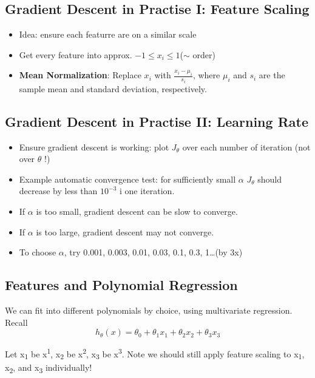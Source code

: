     \subsection{Gradient Descent in Practise I: Feature Scaling} 
    
        \begin{itemize}
            \item Idea: ensure each featurre are on a similar scale
            \item Get every feature into approx. $-1\leq x_i \leq1 $($\sim$ order)
            \item \textbf{Mean Normalization}: Replace $x_i$ with $\frac{x_i - \mu_i}{s_i}$, where $\mu_i$ and $s_i$ are the sample mean and standard deviation, respectively.

        \end{itemize}

    \subsection{Gradient Descent in Practise II: Learning Rate}
        
        \begin{itemize}
            \item Ensure gradient descent is working: plot $J_\theta$ over each number of iteration (not over $\theta$ !)
            \item Example automatic convergence test: for sufficiently small $\alpha$ $J_\theta$ should decrease by less than $10^{-3}$ i one iteration.
            \item If $\alpha$ is too small, gradient descent can be slow to converge.
            \item If $\alpha$ is too large, gradient descent may not converge.
            \item To choose $\alpha$, try 0.001, 0.003, 0.01, 0.03, 0.1, 0.3, 1\ldots (by 3x)
        \end{itemize}


    \subsection{Features and Polynomial Regression}
        We can fit into different polynomials by choice, using multivariate regression. Recall
        \[
            h_\theta (x) = \theta_0 + \theta_1x_1 + \theta_2x_2 +\theta_3x_3 
        \]  

        Let x\textsubscript{1} be x\textsuperscript{1}, x\textsubscript{2} be x\textsuperscript{2}, x\textsubscript{3} be x\textsuperscript{3}.
        Note we should still apply feature scaling to x\textsubscript{1}, x\textsubscript{2}, and x\textsubscript{3} individually! 


